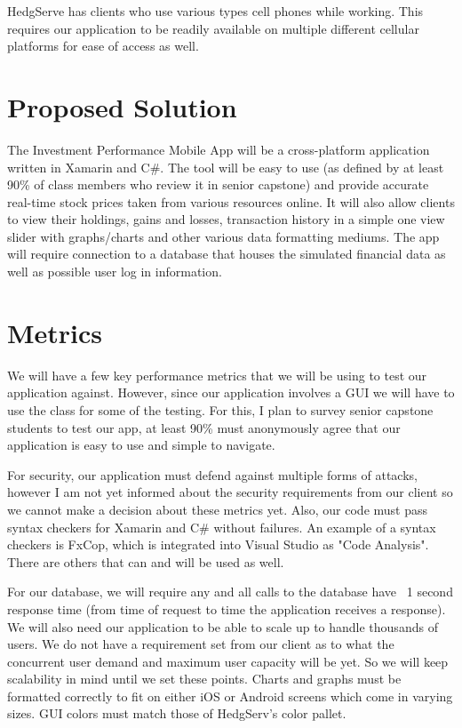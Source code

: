 \documentclass[letterpaper,10pt,titlepage]{article}
\begin{document}
HedgServe has clients who use various types cell phones while working.
This requires our application to be readily available on multiple different cellular
platforms for ease of access as well. 

\section{Proposed Solution}

The Investment Performance Mobile App will be a cross-platform application
written in Xamarin and C\#. The tool will be easy to use (as defined by at least
90\% of class members who review it in senior capstone) and provide accurate real-time
stock prices taken from various resources online. It will also allow clients 
to view their holdings, gains and losses, transaction history in a simple one view
slider with graphs/charts and other various data formatting mediums. The app
will require connection to a database that houses the simulated financial data
as well as possible user log in information.



\section{Metrics}

We will have a few key performance metrics that we will be using to test our
application against. However, since our application involves a GUI we will
have to use the class for some of the testing. For this, I plan to survey 
senior capstone students to test our app, at least 90\% must anonymously 
agree that our application is easy to use and simple to navigate. 

For security,
our application must defend against multiple forms of attacks, however I am not
yet informed about the security requirements from our client so we cannot make
a decision about these metrics yet. Also, our code must pass syntax checkers for 
Xamarin and C\# without failures. An example of a syntax checkers is FxCop, which
is integrated into Visual Studio as "Code Analysis". There are others that can
and will be used as well.

For our database, we will require any and all calls
to the database have ~1 second response time (from time of request to time 
the application receives a response). We will also need our application to be
able to scale up to handle thousands of users. We do not have a requirement 
set from our client as to what the concurrent user demand and maximum user
capacity will be yet. So we will keep scalability in mind until we set these
points. Charts and graphs must be formatted correctly to fit on either iOS or
Android screens which come in varying sizes. GUI colors must match those of
HedgServ's color pallet.
\end{document}
